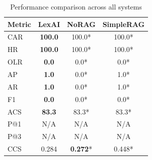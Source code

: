 \begin{table}[ht]
\centering
\caption{Performance comparison across all systems}
\label{tab:main_results}
\begin{tabular}{lccc}
\toprule
\textbf{Metric} & \textbf{LexAI} & \textbf{NoRAG} & \textbf{SimpleRAG} \\
\midrule
CAR & \textbf{100.0} & 100.0* & 100.0* \\
HR & \textbf{100.0} & 100.0* & 100.0* \\
OLR & \textbf{0.0} & 0.0* & 0.0* \\
AP & \textbf{1.0} & 0.0* & 1.0* \\
AR & \textbf{1.0} & 0.0* & 1.0* \\
F1 & \textbf{0.0} & 0.0* & 0.0* \\
ACS & \textbf{83.3} & 83.3* & 83.3* \\
P@1 & N/A & N/A & N/A \\
P@3 & N/A & N/A & N/A \\
CCS & 0.284 & \textbf{0.272}* & 0.448* \\
\bottomrule
\end{tabular}
\end{table}